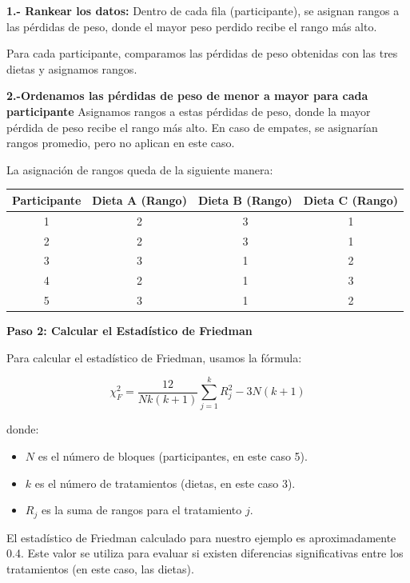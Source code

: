 \documentclass{article}
\begin{document}
\textbf{1.- Rankear los datos:} Dentro de cada fila (participante), se asignan rangos a las pérdidas de peso, donde el mayor peso perdido recibe el rango más alto.

Para cada participante, comparamos las pérdidas de peso obtenidas con las tres dietas y asignamos rangos.

\textbf{2.-Ordenamos las pérdidas de peso de menor a mayor para cada participante}
Asignamos rangos a estas pérdidas de peso, donde la mayor pérdida de peso recibe el rango más alto. En caso de empates, se asignarían rangos promedio, pero no aplican en este caso.

La asignación de rangos queda de la siguiente manera:

\begin{center}
    \begin{tabular}{ c c c c }
        Participante & Dieta A (Rango) & Dieta B (Rango) & Dieta C (Rango) \\
        \hline
        1            & 2               & 3               & 1               \\
        2            & 2               & 3               & 1               \\
        3            & 3               & 1               & 2               \\
        4            & 2               & 1               & 3               \\
        5            & 3               & 1               & 2               \\
    \end{tabular}
\end{center}



\textbf{Paso 2: Calcular el Estadístico de Friedman}

Para calcular el estadístico de Friedman, usamos la fórmula:

\[ \chi_F^2 = \frac{12}{Nk(k+1)} \sum_{j=1}^k R_j^2 - 3N(k+1) \]

donde:
\begin{itemize}
    \item $N$ es el número de bloques (participantes, en este caso 5).
    \item $k$ es el número de tratamientos (dietas, en este caso 3).
    \item $R_j$ es la suma de rangos para el tratamiento $j$.
\end{itemize}

El estadístico de Friedman calculado para nuestro ejemplo es aproximadamente 0.4. Este valor se utiliza para evaluar si existen diferencias significativas entre los tratamientos (en este caso, las dietas).
\end{document}
